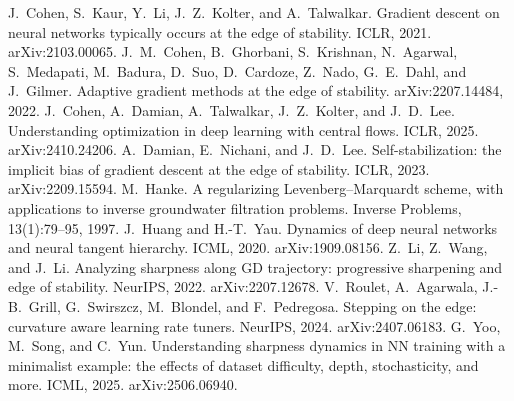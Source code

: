  J.~Cohen, S.~Kaur, Y.~Li, J.~Z.~Kolter, and A.~Talwalkar. Gradient descent on neural networks typically occurs at the edge of stability. ICLR, 2021. arXiv:2103.00065.
 J.~M.~Cohen, B.~Ghorbani, S.~Krishnan, N.~Agarwal, S.~Medapati, M.~Badura, D.~Suo, D.~Cardoze, Z.~Nado, G.~E.~Dahl, and J.~Gilmer. Adaptive gradient methods at the edge of stability. arXiv:2207.14484, 2022.
 J.~Cohen, A.~Damian, A.~Talwalkar, J.~Z.~Kolter, and J.~D.~Lee. Understanding optimization in deep learning with central flows. ICLR, 2025. arXiv:2410.24206.
 A.~Damian, E.~Nichani, and J.~D.~Lee. Self-stabilization: the implicit bias of gradient descent at the edge of stability. ICLR, 2023. arXiv:2209.15594.
 M.~Hanke. A regularizing Levenberg--Marquardt scheme, with applications to inverse groundwater filtration problems. Inverse Problems, 13(1):79--95, 1997.
 J.~Huang and H.-T.~Yau. Dynamics of deep neural networks and neural tangent hierarchy. ICML, 2020. arXiv:1909.08156.
 Z.~Li, Z.~Wang, and J.~Li. Analyzing sharpness along GD trajectory: progressive sharpening and edge of stability. NeurIPS, 2022. arXiv:2207.12678.
 V.~Roulet, A.~Agarwala, J.-B.~Grill, G.~Swirszcz, M.~Blondel, and F.~Pedregosa. Stepping on the edge: curvature aware learning rate tuners. NeurIPS, 2024. arXiv:2407.06183.
 G.~Yoo, M.~Song, and C.~Yun. Understanding sharpness dynamics in NN training with a minimalist example: the effects of dataset difficulty, depth, stochasticity, and more. ICML, 2025. arXiv:2506.06940.
